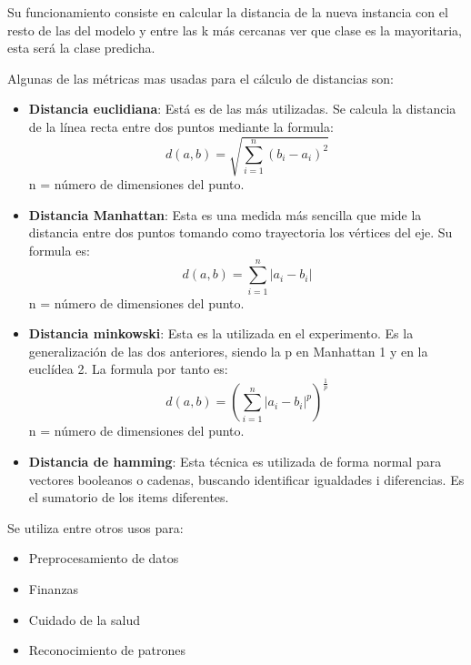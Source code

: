 Su funcionamiento consiste en calcular la distancia de la nueva instancia con el resto de las del modelo y entre las k más cercanas ver que clase es la mayoritaria, esta será la clase predicha.

Algunas de las métricas mas usadas para el cálculo de distancias son:

\begin{itemize}
	\item\textbf{Distancia euclidiana}: Está es de las más utilizadas. Se calcula la distancia de la línea recta entre dos puntos mediante la formula:
	\begin{equation}
		d(a,b)=\sqrt{\sum_{i=1}^{n}(b_{i}-a_{i})^{2}}
	\end{equation}
	n = número de dimensiones del punto.
	
	\item\textbf{Distancia Manhattan}: Esta es una medida más sencilla que mide la distancia entre dos puntos tomando  como trayectoria los vértices del eje. Su formula es:
	\begin{equation}
		d(a,b)=\sum_{i=1}^{n}|a_{i}-b_{i}|
	\end{equation}
	n = número de dimensiones del punto.
	
	\item\textbf{Distancia minkowski}: Esta es la utilizada en el experimento. Es la generalización de las dos anteriores, siendo la p en Manhattan  1 y en la euclídea 2. La formula por tanto es:
	\begin{equation}
		d(a,b)=(\sum_{i=1}^{n}|a_{i}-b_{i}|^p)^{\frac{1}{p}}
	\end{equation}
	n = número de dimensiones del punto.
	
	\item\textbf{Distancia de hamming}:  Esta técnica es utilizada de forma normal para vectores booleanos o cadenas, buscando identificar igualdades i diferencias. Es el sumatorio de los items diferentes.
	
\end{itemize}

Se utiliza entre otros usos para:

\begin{itemize}
	\item{Preprocesamiento de datos}
	
	\item{Finanzas}
	
	\item{Cuidado de la salud}
	
	\item{Reconocimiento de patrones} 
		
\end{itemize}

